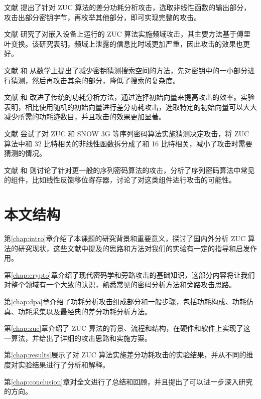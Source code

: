 文献 \parencite{zuc_attack_tangming} 提出了针对 ZUC 算法的差分功耗分析攻击，选取非线性函数的输出部分，攻击出部分密钥字节，再枚举其他部分，即可实现完整的攻击。

文献 \parencite{zuc_freq} 研究了对嵌入设备上运行的 ZUC 算法实施频域攻击，其主要方法基于傅里叶变换。该研究表明，频域上泄露的信息比时域更加严重，因此攻击的效果也更好。

文献 \parencite{zuc_security} 和 \parencite{zuc_analyical} 从数学上提出了减少密钥猜测搜索空间的方法，先对密钥中的一小部分进行猜测，然后再攻击其余的部分，降低了搜索的复杂度。

文献 \parencite{zuc_iv} 和 \parencite{zuc_wu}改进了传统的功耗分析方法，通过选择初始向量来提高攻击的效率。实验表明，相比使用随机的初始向量进行差分功耗攻击，选取特定的初始向量可以大大减少所需的功耗迹数目，并且攻击的效果更加显著。

文献 \parencite{zuc_guess} 尝试了对 ZUC 和 SNOW 3G 等序列密码算法实施猜测决定攻击，将 ZUC 算法中和 32 比特相关的非线性函数拆分成了和 16 比特相关，减小了攻击时需要猜测的情况。

文献 \parencite{stream_fischer} 和 \parencite{stream_gu} 则讨论了针对更一般的序列密码算法的攻击，分析了序列密码算法中常见的组件，比如线性反馈移位寄存器，讨论了对这类组件进行攻击的可能性。

\section{本文结构}

第\ref{chap:intro}章介绍了本课题的研究背景和重要意义，探讨了国内外分析 ZUC 算法的研究现状，这些文献中提及的思路和方法对我们的实验有一定的指导和启发作用。

第\ref{chap:crypto}章介绍了现代密码学和旁路攻击的基础知识，这部分内容将让我们对整个领域有一个大致的认识，熟悉常见的密码分析方法和旁路攻击思路。

第\ref{chap:dpa}章介绍了功耗分析攻击组成部分和一般步骤，包括功耗构成、功耗仿真、功耗采集以及最经典的差分功耗分析方法。

第\ref{chap:zuc}章介绍了 ZUC 算法的背景、流程和结构，在硬件和软件上实现了这一算法，并给出了详细的攻击思路和实施方案。

第\ref{chap:results}展示了对 ZUC 算法实施差分功耗攻击的实验结果，并从不同的维度对实验结果进行了分析和解释。

第\ref{chap:conclusion}章对全文进行了总结和回顾，并且提出了可以进一步深入研究的方向。

